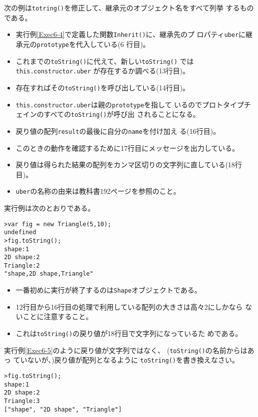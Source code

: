\begin{Exec}\upshape\label{Exec6-5}
次の例は\texttt{totring()}を修正して、継承元のオブジェクト名をすべて列挙
するものである。
\begin{itemize}
 \item 実行例\ref{Exec6-4}で定義した関数\texttt{Inherit()}に、継承先のプ
       ロパティ\texttt{uber}に継承元の\texttt{prototype}を代入している(6
       行目)。
 \item これまでの\texttt{toString()}に代えて、新しい\texttt{toString()}
       では
       \texttt{this.constructor.uber} が存在するか調べる(13行目)。
 \item 存在すればその\texttt{toString()}を呼び出している(14行目)。
 \item \texttt{this.constructor.uber}は親の\texttt{prototype}を指して
       いるのでプロトタイプチェインのすべての\texttt{toString()}が呼び出
       されることになる。
 \item 戻り値の配列\texttt{result}の最後に自分の\texttt{name}を付け加え
       る(16行目)。
 \item このときの動作を確認するために17行目にメッセージを出力している。
 \item 戻り値は得られた結果の配列をカンマ区切りの文字列に直している(18行目)。
 \item \texttt{uber}の名称の由来は教科書192ページを参照のこと。
\end{itemize}
実行例は次のとおりである。
\begin{verbatim}
>var fig = new Triangle(5,10);
undefined
>fig.toString();
shape:1
2D shape:2 
Triangle:2 
"shape,2D shape,Triangle"
\end{verbatim}
\begin{itemize}
 \item 一番初めに実行が終了するのは\texttt{Shape}オブジェクトである。
 \item 12行目から16行目の処理で利用している配列の大きさは高々2にしかなら
       ないことに注意すること。
 \item これは\texttt{toString()}の戻り値が18行目で文字列になっているた
       めである。
\end{itemize}
\end{Exec}
\begin{Prob}
\upshape
実行例\ref{Exec6-5}のように戻り値が文字列ではなく、
(\texttt{toString()}の名前からはあっ
 ていないが、)戻り値が配列となるように
 \texttt{toString()}を書き換えなさい。
\begin{verbatim}
>fig.toString();
shape:1 
2D shape:2
Triangle:3
["shape", "2D shape", "Triangle"]
\end{verbatim}
\end{Prob}